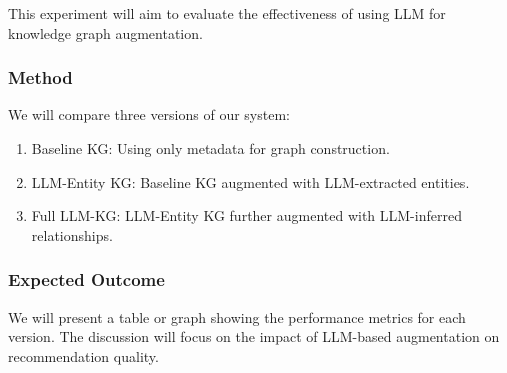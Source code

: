 \documentclass{article}
\begin{document}
This experiment will aim to evaluate the effectiveness of using LLM for knowledge graph augmentation.

\subsubsection{Method}
We will compare three versions of our system:
\begin{enumerate}
    \item Baseline KG: Using only metadata for graph construction.
    \item LLM-Entity KG: Baseline KG augmented with LLM-extracted entities.
    \item Full LLM-KG: LLM-Entity KG further augmented with LLM-inferred relationships.
\end{enumerate}

\subsubsection{Expected Outcome}
We will present a table or graph showing the performance metrics for each version. The discussion will focus on the impact of LLM-based augmentation on recommendation quality.
\end{document}
